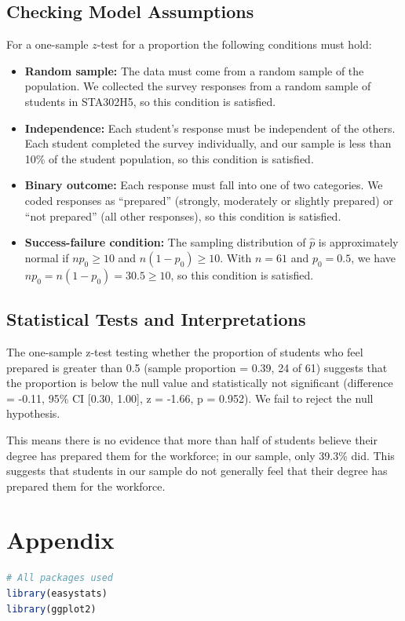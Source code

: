 \documentclass{article}
\begin{document}
\subsection{Checking Model Assumptions}
For a one-sample $z$-test for a proportion the following conditions must hold:
\begin{itemize}
    \item \textbf{Random sample:} The data must come from a random sample of the
    population. We collected the survey responses from a random sample of
    students in STA302H5, so this condition is satisfied.
    \item \textbf{Independence:} Each student's response must be independent of
    the others. Each student completed the survey individually, and our sample
    is less than 10\% of the student population, so this condition is satisfied.
    \item \textbf{Binary outcome:} Each response must fall into one of two
    categories. We coded responses as ``prepared'' (strongly, moderately or
    slightly prepared) or ``not prepared'' (all other responses), so this
    condition is satisfied.
    \item \textbf{Success-failure condition:} The sampling distribution of
    $\hat{p}$ is approximately normal if $np_0 \geq 10$ and
    $n(1 - p_0) \geq 10$. With $n = 61$ and $p_0 = 0.5$, we have
    $np_0 = n(1 - p_0) = 30.5 \geq 10$, so this condition is satisfied.
\end{itemize}

\subsection{Statistical Tests and Interpretations}
The one-sample z-test testing whether the proportion of students who feel prepared is greater than 0.5 (sample proportion = 0.39, 24 of 61) suggests that the proportion is below the null value and statistically not significant (difference = -0.11, 95\% CI [0.30, 1.00], z = -1.66, p = 0.952). We fail to reject the null hypothesis.

\n This means there is no evidence that more than half of students believe their degree has prepared them for the workforce; in our sample, only 39.3\% did. This suggests that students in our sample do not generally feel that their degree has prepared them for the workforce.


\newpage
\appendix
\section{Appendix}
\begin{lstlisting}[language=R]
# All packages used
library(easystats)
library(ggplot2)
\end{lstlisting}
\end{document}
